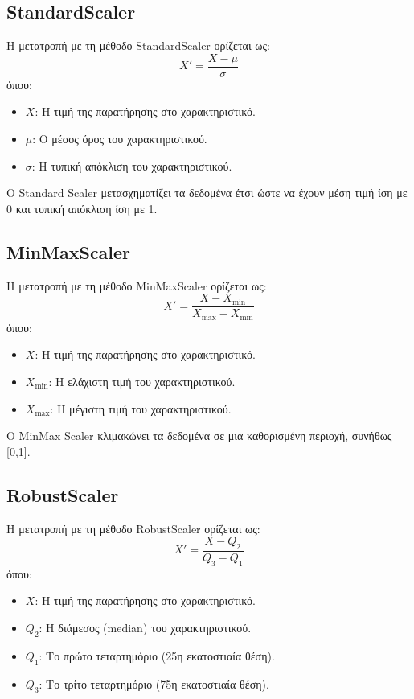 \documentclass[12pt]{article}
\begin{document}
\subsection*{StandardScaler}
Η μετατροπή με τη μέθοδο StandardScaler ορίζεται ως:
\[
X' = \frac{X - \mu}{\sigma}
\]
όπου:
\begin{itemize}
    \item \( X \): Η τιμή της παρατήρησης στο χαρακτηριστικό.
    \item \( \mu \): Ο μέσος όρος του χαρακτηριστικού.
    \item \( \sigma \): Η τυπική απόκλιση του χαρακτηριστικού.
\end{itemize}

\noindent Ο Standard Scaler μετασχηματίζει τα δεδομένα έτσι ώστε να έχουν μέση τιμή ίση με 0 και τυπική απόκλιση ίση με 1.

\subsection*{MinMaxScaler}
Η μετατροπή με τη μέθοδο MinMaxScaler ορίζεται ως:
\[
X' = \frac{X - X_{\text{min}}}{X_{\text{max}} - X_{\text{min}}}
\]
όπου:
\begin{itemize}
    \item \( X \): Η τιμή της παρατήρησης στο χαρακτηριστικό.
    \item \( X_{\text{min}} \): Η ελάχιστη τιμή του χαρακτηριστικού.
    \item \( X_{\text{max}} \): Η μέγιστη τιμή του χαρακτηριστικού.
\end{itemize}

\noindent Ο MinMax Scaler κλιμακώνει τα δεδομένα σε μια καθορισμένη περιοχή, συνήθως [0,1].



\subsection*{RobustScaler}
Η μετατροπή με τη μέθοδο RobustScaler ορίζεται ως:
\[
X' = \frac{X - Q_2}{Q_3 - Q_1}
\]
όπου:
\begin{itemize}
    \item \( X \): Η τιμή της παρατήρησης στο χαρακτηριστικό.
    \item \( Q_2 \): Η διάμεσος (median) του χαρακτηριστικού.
    \item \( Q_1 \): Το πρώτο τεταρτημόριο (25η εκατοστιαία θέση).
    \item \( Q_3 \): Το τρίτο τεταρτημόριο (75η εκατοστιαία θέση).\\
\end{itemize}
\end{document}
